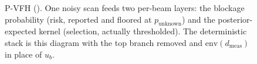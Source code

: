 \begin{figure}[H]
{%
}
\caption{P-VFH (). One noisy scan feeds two per-beam layers:
the blockage probability (risk, reported and floored at $p_{\mathrm{unknown}}$)
and the posterior-expected kernel (selection, actually thresholded). The
deterministic stack is this diagram with the top branch removed and
$\mathrm{env}(d_{\mathrm{meas}})$ in place of $u_b$.}
\label{fig:pvfhflow}
\end{figure}
